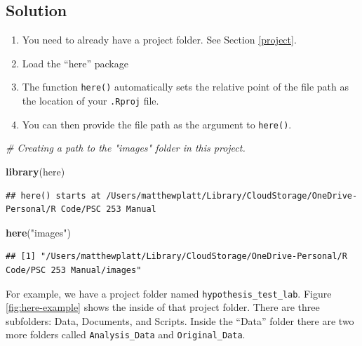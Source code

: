 \documentclass[
]{book}
\newenvironment{Shaded}{\begin{snugshade}}{\end{snugshade}}
\newcommand{\CommentTok}[1]{\textcolor[rgb]{0.56,0.35,0.01}{\textit{#1}}}
\newcommand{\FunctionTok}[1]{\textcolor[rgb]{0.13,0.29,0.53}{\textbf{#1}}}
\newcommand{\NormalTok}[1]{#1}
\newcommand{\StringTok}[1]{\textcolor[rgb]{0.31,0.60,0.02}{#1}}
\providecommand{\tightlist}{%
  \setlength{\itemsep}{0pt}\setlength{\parskip}{0pt}}
\begin{document}
\hypertarget{solution-8}{%
\subsection{Solution}\label{solution-8}}

\begin{enumerate}
\def\labelenumi{\arabic{enumi}.}
\tightlist
\item
  You need to already have a project folder. See Section \ref{project}.
\item
  Load the ``here'' package
\item
  The function \texttt{here()} automatically sets the relative point of the file path as the location of your \texttt{.Rproj} file.
\item
  You can then provide the file path as the argument to \texttt{here()}.
\end{enumerate}

\begin{Shaded}
\begin{Highlighting}[]
\CommentTok{\# Creating a path to the "images" folder in this project.}

\FunctionTok{library}\NormalTok{(here)}
\end{Highlighting}
\end{Shaded}

\begin{verbatim}
## here() starts at /Users/matthewplatt/Library/CloudStorage/OneDrive-Personal/R Code/PSC 253 Manual
\end{verbatim}

\begin{Shaded}
\begin{Highlighting}[]
\FunctionTok{here}\NormalTok{(}\StringTok{"images"}\NormalTok{)}
\end{Highlighting}
\end{Shaded}

\begin{verbatim}
## [1] "/Users/matthewplatt/Library/CloudStorage/OneDrive-Personal/R Code/PSC 253 Manual/images"
\end{verbatim}

For example, we have a project folder named \texttt{hypothesis\_test\_lab}. Figure \ref{fig:here-example} shows the inside of that project folder. There are three subfolders: Data, Documents, and Scripts. Inside the ``Data'' folder there are two more folders called \texttt{Analysis\_Data} and \texttt{Original\_Data}.
\end{document}
